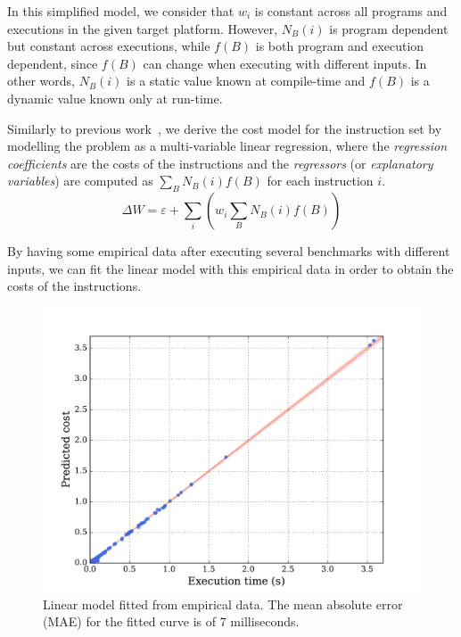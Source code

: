 In this simplified model, we consider that $w_i$ is constant across all programs and executions in the given target platform.
However, $N_B(i)$ is program dependent but constant across executions, while $f(B)$ is both program and execution dependent, since $f(B)$ can change when executing with different inputs.
In other words, $N_B(i)$ is a static value known at compile-time and $f(B)$ is a dynamic value known only at run-time.

%

Similarly to previous work~\citep{giusto01,powell09,brandolese11}, we derive the cost model for the instruction set by modelling the problem as a multi-variable linear regression, where the \textit{regression coefficients} are the costs of the instructions and the \textit{regressors} (or \textit{explanatory variables}) are computed as $\sum_B N_B(i)f(B)$ for each instruction $i$.
\[
\Delta W = \varepsilon + \sum_{i} \left(w_i \sum_{B} N_B(i)f(B)\right)
\]

By having some empirical data after executing several benchmarks with different inputs, we can fit the linear model with this empirical data in order to obtain the costs of the instructions.

\begin{figure}[htb]
    \centering
    \includegraphics[width=0.9\linewidth]{figs/cost-model.pdf}
    \caption{Linear model fitted from empirical data. The mean absolute error (MAE) for the fitted curve is of 7 milliseconds.}
    \label{fig:cost-model}
\end{figure}

